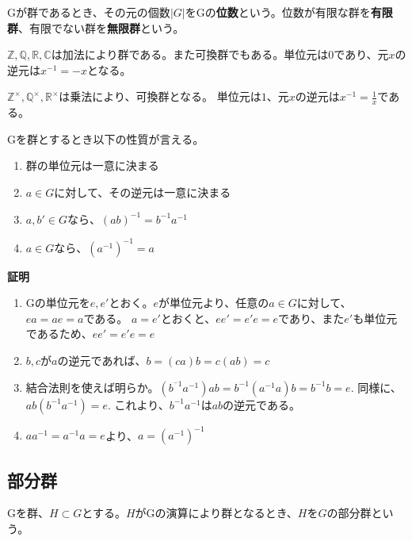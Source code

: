 \documentclass[dvipdfmx,autodetect-engine]{jsarticle}
\begin{document}

Gが群であるとき、その元の個数$|G|$をGの{\bf 位数}という。位数が有限な群を{\bf 有限群}、有限でない群を{\bf 無限群}という。

\exam $\mathbb{Z}, \mathbb{Q}, \mathbb{R}, \mathbb{C}$は加法により群である。また可換群でもある。単位元は$0$であり、元$x$の逆元は$x^{-1} = -x$となる。

\exam $\mathbb{Z}^×, \mathbb{Q}^×, \mathbb{R}^×$は乗法により、可換群となる。
単位元は$1$、元$x$の逆元は$x^{-1} = \frac{1}{x}$である。

\prop

Gを群とするとき以下の性質が言える。

\begin{enumerate}
\renewcommand{\labelenumi}{(\arabic{enumi})}
\item 群の単位元は一意に決まる
\item $a \in G$に対して、その逆元は一意に決まる
\item $a, b' \in G$なら、$(ab)^{-1} = b^{-1}a^{-1}$
\item $a \in G$なら、$(a^{-1})^{-1} = a$
\end{enumerate}

{\bf 証明}

\begin{enumerate}
\renewcommand{\labelenumi}{(\arabic{enumi})}
\item Gの単位元を$e, e'$とおく。$e$が単位元より、任意の$a \in G$に対して、$ea = ae = a$である。
$a = e'$とおくと、$ee' = e'e = e$であり、また$e'$も単位元であるため、$ee' = e'e = e$
\item $b, c$が$a$の逆元であれば、$b = (ca)b = c(ab) = c$
\item 結合法則を使えば明らか。$(b^{^-1}a^{-1})ab = b^{-1}(a^{-1}a)b = b^{-1}b = e$. 同様に、$ab(b^{-1}a^{-1}) = e$. これより、$b^{-1}a^{-1}$は$ab$の逆元である。
\item $aa^{-1} = a^{-1}a = e$より、$a = (a^{-1})^{-1}$

\end{enumerate}

\subsection{部分群}

Gを群、$H \subset G$とする。$H$がGの演算により群となるとき、$H$を$G$の部分群という。

\label{sec:propSubGroup}
\end{document}
